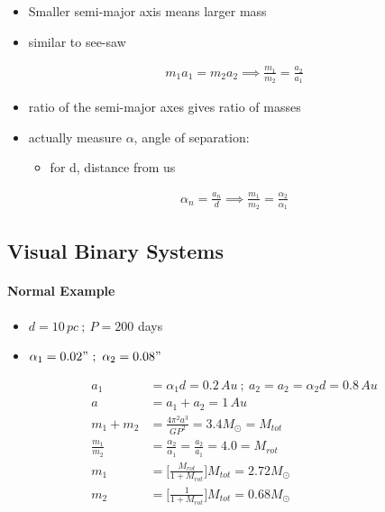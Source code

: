 \documentclass[a4paper,11pt,normalem]{article}
\begin{document}
\begin{itemize}
    \item Smaller semi-major axis means larger mass
    \item similar to see-saw
\end{itemize}
\begin{align*}
    m_1 a_1 = m_2 a_2 \implies \frac{m_1}{m_2} = \frac{a_2}{a_1}
\end{align*}

\begin{itemize}
    \item ratio of the semi-major axes gives ratio of masses
    \item actually measure \(\alpha\), angle of separation:
        \begin{itemize}
            \item for d, distance from us
        \end{itemize}
\end{itemize}
\begin{align*}
    \alpha_n = \frac{a_n}{d} \implies \frac{m_1}{m_2} = \frac{\alpha_2}{\alpha_1}
\end{align*}

\subsection{Visual Binary Systems}
\paragraph{Normal Example}
\begin{itemize}
    \item \(d = 10\,pc ~;~ P = 200\) days
    \item \(\alpha_1 = 0.02" ~;~ \alpha_2 = 0.08"\)
\end{itemize}

\begin{align*}
    a_1 &= \alpha_1 d = 0.2\,Au ~;~ a_2 = a_2 = \alpha_2 d = 0.8\,Au \\
    a &= a_1 + a_2 = 1\,Au \\
    m_1 + m_2 &= \frac{4\pi^2 a^3}{GP^2} = 3.4 M_\odot = M_{tot} \\
    \frac{m_1}{m_2} &= \frac{\alpha_2}{\alpha_1} = \frac{a_2}{a_1} = 4.0 = M_{rot}\\
    m_1 &= \Big[\frac{M_{rot}}{1 + M_{rot}}\Big]M_{tot} = 2.72 M_\odot\\
    m_2 &= \Big[\frac{1}{1 + M_{rot}}\Big]M_{tot} = 0.68 M_\odot
\end{align*}
\end{document}
